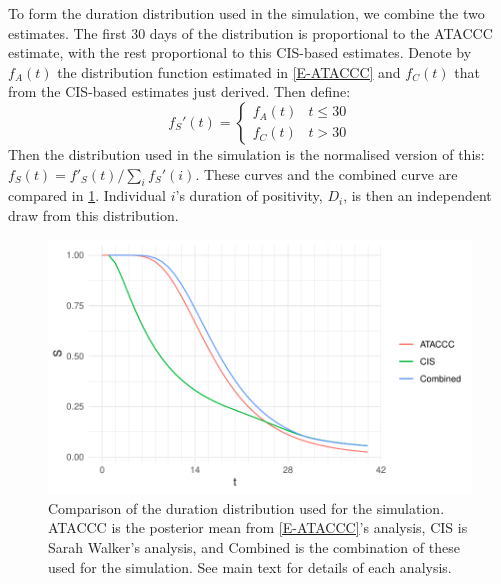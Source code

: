 \documentclass[12pt, letterpaper]{article} %
\begin{document}
To form the duration distribution used in the simulation, we combine the two estimates.
The first 30 days of the distribution is proportional to the ATACCC estimate, with the rest proportional to this CIS-based estimates.
Denote by $f_A(t)$ the distribution function estimated in \cref{E-ATACCC} and $f_C(t)$ that from the CIS-based estimates just derived.
Then define:
$$
f_S'(t) = \begin{cases}
	f_A(t) &t \leq 30 \\
	f_C(t) &t > 30
\end{cases}
$$
Then the distribution used in the simulation is the normalised version of this: $f_S(t) = f'_S(t)/\sum_i f_S'(i)$.
These curves and the combined curve are compared in \cref{perf-test:fig:duration-dist}.
Individual $i$'s duration of positivity, $D_i$, is then an independent draw from this distribution.
\begin{figure}
  \centering \includegraphics{cis-perfect-testing/input-duration-dists}
  \caption[Comparison of duration distributions]{Comparison of the duration distribution used for the simulation. ATACCC is the posterior mean from \cref{E-ATACCC}'s analysis, CIS is Sarah Walker's analysis, and Combined is the combination of these used for the simulation. See main text for details of each analysis. \label{perf-test:fig:duration-dist}}
\end{figure}
\end{document}
